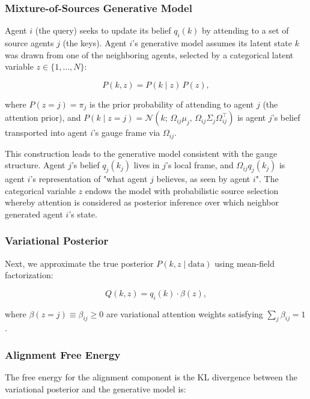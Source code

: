 \documentclass[twoside,11pt]{article}
\begin{document}
\subsubsection{Mixture-of-Sources Generative Model}

Agent $i$ (the query) seeks to update its belief $q_i(k)$ by attending to a set of source agents $j$ (the keys). Agent $i$'s generative model assumes its latent state $k$ was drawn from one of the neighboring agents, selected by a categorical latent variable $z \in \{1, \ldots, N\}$:

\begin{equation}
P(k, z) = P(k \mid z)\, P(z),
\label{eq:mixture_joint}
\end{equation}

where $P(z = j) = \pi_j$ is the prior probability of attending to agent $j$ (the attention prior), and $P(k \mid z = j) = \mathcal{N}(k;\, \Omega_{ij}\mu_j,\, \Omega_{ij}\Sigma_j\Omega_{ij}^\top)$ is agent $j$'s belief transported into agent $i$'s gauge frame via $\Omega_{ij}$.

This construction leads to the generative model consistent with the gauge structure. Agent $j$'s belief $q_j(k_j)$ lives in $j$'s local frame, and $\Omega_{ij}q_j(k_j)$ is agent $i$'s representation of "what agent $j$ believes, as seen by agent $i$". The categorical variable $z$ endows the model with probabilistic source selection whereby attention is considered as posterior inference over which neighbor generated agent $i$'s state. 

\subsubsection{Variational Posterior}

Next, we approximate the true posterior $P(k, z \mid \text{data})$ using mean-field factorization:

\begin{equation}
Q(k, z) = q_i(k) \cdot \beta(z),
\label{eq:mixture_posterior}
\end{equation}

where $\beta(z = j) \equiv \beta_{ij} \geq 0$ are variational attention weights satisfying $\sum_j \beta_{ij} = 1$.

\subsubsection{Alignment Free Energy}

The free energy for the alignment component is the KL divergence between the variational posterior and the generative model is:
\end{document}
